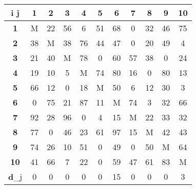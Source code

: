 \documentclass[17pt]{extarticle}
\begin{document}
\begin{table}[H]
    \centering
    \begin{tabular}{|c|c|c|c|c|c|c|c|c|c|c|}
        \hline
        \textbf{i j} & \textbf{1} & \textbf{2} & \textbf{3} & \textbf{4} & \textbf{5} & \textbf{6} & \textbf{7} & \textbf{8} & \textbf{9} & \textbf{10} \\ \hline
        \textbf{1}   & M          & 22         & 56         & 6          & 51         & 68         & 0          & 32         & 46         & 75          \\ \hline
        \textbf{2}   & 38         & M          & 38         & 76         & 44         & 47         & 0          & 20         & 49         & 4           \\ \hline
        \textbf{3}   & 21         & 40         & M          & 78         & 0          & 60         & 57         & 38         & 0          & 24          \\ \hline
        \textbf{4}   & 19         & 10         & 5          & M          & 74         & 80         & 16         & 0          & 80         & 13          \\ \hline
        \textbf{5}   & 66         & 12         & 0          & 18         & M          & 50         & 6          & 12         & 30         & 3           \\ \hline
        \textbf{6}   & 0          & 75         & 21         & 87         & 11         & M          & 74         & 3          & 32         & 66          \\ \hline
        \textbf{7}   & 92         & 28         & 96         & 0          & 4          & 15         & M          & 22         & 33         & 32          \\ \hline
        \textbf{8}   & 77         & 0          & 46         & 23         & 61         & 97         & 15         & M          & 42         & 43          \\ \hline
        \textbf{9}   & 74         & 26         & 10         & 51         & 0          & 49         & 0          & 50         & M          & 64          \\ \hline
        \textbf{10}  & 41         & 66         & 7          & 22         & 0          & 59         & 47         & 61         & 83         & M           \\ \hline
        \textbf{d}_j & 0          & 0          & 0          & 0          & 0          & 15         & 0          & 0          & 0          & 3           \\ \hline
    \end{tabular}
\end{table}
\end{document}
